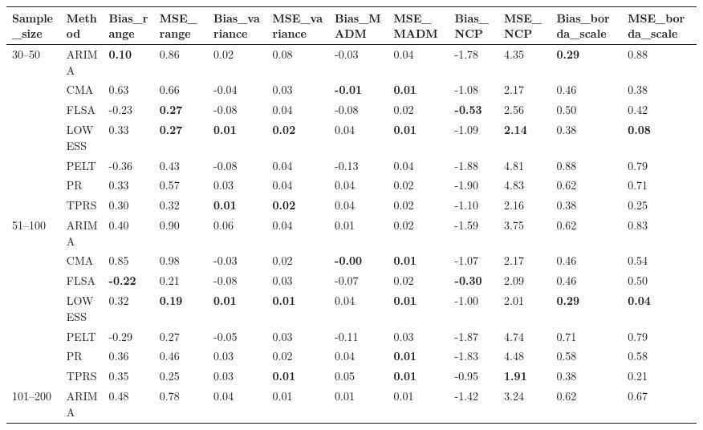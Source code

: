 \begin{table}[ht]
\centering
\begin{tabular}{llllllllllll}
  \toprule
Sample_size & Method & Bias_range & MSE_range & Bias_variance & MSE_variance & Bias_MADM & MSE_MADM & Bias_NCP & MSE_NCP & Bias_borda_scale & MSE_borda_scale \\ 
  \midrule
30–50 & ARIMA & \textbf{0.10} & 0.86 & 0.02 & 0.08 & -0.03 & 0.04 & -1.78 & 4.35 & \textbf{0.29} & 0.88 \\ 
   & CMA & 0.63 & 0.66 & -0.04 & 0.03 & \textbf{-0.01} & \textbf{0.01} & -1.08 & 2.17 & 0.46 & 0.38 \\ 
   & FLSA & -0.23 & \textbf{0.27} & -0.08 & 0.04 & -0.08 & 0.02 & \textbf{-0.53} & 2.56 & 0.50 & 0.42 \\ 
   & LOWESS & 0.33 & \textbf{0.27} & \textbf{0.01} & \textbf{0.02} & 0.04 & \textbf{0.01} & -1.09 & \textbf{2.14} & 0.38 & \textbf{0.08} \\ 
   & PELT & -0.36 & 0.43 & -0.08 & 0.04 & -0.13 & 0.04 & -1.88 & 4.81 & 0.88 & 0.79 \\ 
   & PR & 0.33 & 0.57 & 0.03 & 0.04 & 0.04 & 0.02 & -1.90 & 4.83 & 0.62 & 0.71 \\ 
   & TPRS & 0.30 & 0.32 & \textbf{0.01} & \textbf{0.02} & 0.04 & 0.02 & -1.10 & 2.16 & 0.38 & 0.25 \\ 
  51–100 & ARIMA & 0.40 & 0.90 & 0.06 & 0.04 & 0.01 & 0.02 & -1.59 & 3.75 & 0.62 & 0.83 \\ 
   & CMA & 0.85 & 0.98 & -0.03 & 0.02 & \textbf{-0.00} & \textbf{0.01} & -1.07 & 2.17 & 0.46 & 0.54 \\ 
   & FLSA & \textbf{-0.22} & 0.21 & -0.08 & 0.03 & -0.07 & 0.02 & \textbf{-0.30} & 2.09 & 0.46 & 0.50 \\ 
   & LOWESS & 0.32 & \textbf{0.19} & \textbf{0.01} & \textbf{0.01} & 0.04 & \textbf{0.01} & -1.00 & 2.01 & \textbf{0.29} & \textbf{0.04} \\ 
   & PELT & -0.29 & 0.27 & -0.05 & 0.03 & -0.11 & 0.03 & -1.87 & 4.74 & 0.71 & 0.79 \\ 
   & PR & 0.36 & 0.46 & 0.03 & 0.02 & 0.04 & \textbf{0.01} & -1.83 & 4.48 & 0.58 & 0.58 \\ 
   & TPRS & 0.35 & 0.25 & 0.03 & \textbf{0.01} & 0.05 & \textbf{0.01} & -0.95 & \textbf{1.91} & 0.38 & 0.21 \\ 
  101–200 & ARIMA & 0.48 & 0.78 & 0.04 & 0.01 & 0.01 & 0.01 & -1.42 & 3.24 & 0.62 & 0.67 \\ 

\end{tabular}
\end{table}
